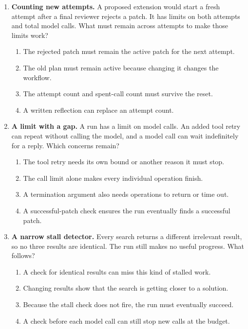 \begin{enumerate}[start=21,itemsep=0.7\baselineskip]
\item\label{exercise:27} \begin{minipage}[t]{\linewidth}
\textbf{Counting new attempts.} A proposed extension would start a fresh attempt after a final reviewer rejects a patch. It has limits on both attempts and total model calls. What must remain across attempts to make those limits work?
\begin{enumerate}[label=\textnormal{(\Alph*)},leftmargin=*,itemsep=0pt]
\item The rejected patch must remain the active patch for the next attempt.
\item The old plan must remain active because changing it changes the workflow.
\item The attempt count and spent-call count must survive the reset.
\item A written reflection can replace an attempt count.
\end{enumerate}
\end{minipage}

\item\label{exercise:28} \begin{minipage}[t]{\linewidth}
\textbf{A limit with a gap.} A run has a limit on model calls. An added tool retry can repeat without calling the model, and a model call can wait indefinitely for a reply. Which concerns remain?
\begin{enumerate}[label=\textnormal{(\Alph*)},leftmargin=*,itemsep=0pt]
\item The tool retry needs its own bound or another reason it must stop.
\item The call limit alone makes every individual operation finish.
\item A termination argument also needs operations to return or time out.
\item A successful-patch check ensures the run eventually finds a successful patch.
\end{enumerate}
\end{minipage}

\item\label{exercise:29} \begin{minipage}[t]{\linewidth}
\textbf{A narrow stall detector.} Every search returns a different irrelevant result, so no three results are identical. The run still makes no useful progress. What follows?
\begin{enumerate}[label=\textnormal{(\Alph*)},leftmargin=*,itemsep=0pt]
\item A check for identical results can miss this kind of stalled work.
\item Changing results show that the search is getting closer to a solution.
\item Because the stall check does not fire, the run must eventually succeed.
\item A check before each model call can still stop new calls at the budget.
\end{enumerate}
\end{minipage}


\end{enumerate}

